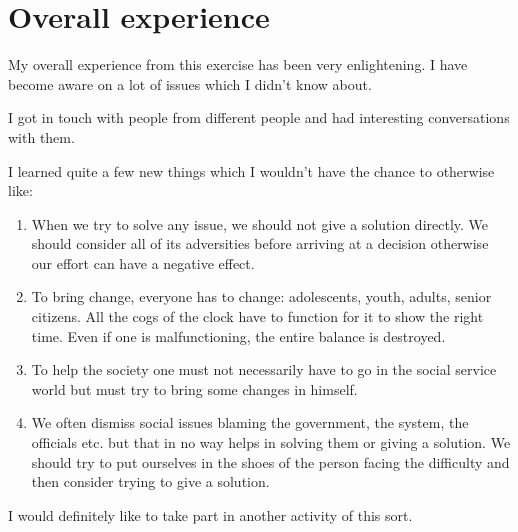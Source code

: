 \chapter{Overall experience}

\vspace{0cm}

My overall experience from this exercise has been very enlightening. I have become aware on a lot of issues which I didn't know about.

I got in touch with people from different people and had interesting conversations with them. 

I learned quite a few new things which I wouldn't have the chance to otherwise like:
\begin{enumerate}
\item When we try to solve any issue, we should not give a solution directly. We should consider all of its adversities before arriving at a decision otherwise our effort can have a negative effect.
\item To bring change, everyone has to change: adolescents, youth, adults, senior citizens. All the cogs of the clock have to function for it to show the right time. Even if one is malfunctioning, the entire balance is destroyed.
\item To help the society one must not necessarily have to go in the social service world but must try to bring some changes in himself.
\item We often dismiss social issues blaming the government, the system, the officials etc. but that in no way helps in solving them or giving a solution. We should try to put ourselves in the shoes of the person facing the difficulty and then consider trying to give a solution.
\end{enumerate}

I would definitely like to take part in another activity of this sort.

